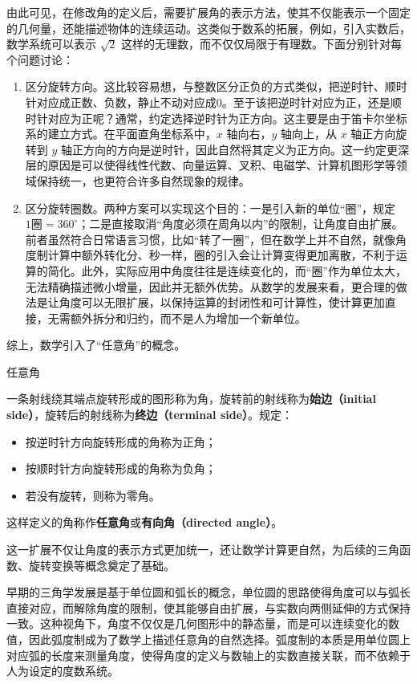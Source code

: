 由此可见，在修改角的定义后，需要扩展角的表示方法，使其不仅能表示一个固定的几何量，还能描述物体的连续运动。这类似于数系的拓展，例如，引入实数后，数学系统可以表示 $\sqrt{2}$ 这样的无理数，而不仅仅局限于有理数。下面分别针对每个问题讨论：
\begin{enumerate}
\item 区分旋转方向。这比较容易想，与整数区分正负的方式类似，把逆时针、顺时针对应成正数、负数，静止不动对应成$0$。至于该把逆时针对应为正，还是顺时针对应为正呢？通常，约定选择逆时针为正方向。这主要是由于笛卡尔坐标系的建立方式。在平面直角坐标系中，$x$ 轴向右，$y$ 轴向上，从 $x$ 轴正方向旋转到 $y$ 轴正方向的方向是逆时针，因此自然将其定义为正方向。这一约定更深层的原因是可以使得线性代数、向量运算、叉积、电磁学、计算机图形学等领域保持统一，也更符合许多自然现象的规律。
\item 区分旋转圈数。两种方案可以实现这个目的：一是引入新的单位“圈”，规定$1\text{圈}=360^\circ$；二是直接取消“角度必须在周角以内”的限制，让角度自由扩展。前者虽然符合日常语言习惯，比如“转了一圈”，但在数学上并不自然，就像角度制计算中额外转化分、秒一样，圈的引入会让计算变得更加离散，不利于运算的简化。此外，实际应用中角度往往是连续变化的，而“圈”作为单位太大，无法精确描述微小增量，因此并无额外优势。从数学的发展来看，更合理的做法是让角度可以无限扩展，以保持运算的封闭性和可计算性，使计算更加直接，无需额外拆分和归约，而不是人为增加一个新单位。
\end{enumerate}

综上，数学引入了“任意角”的概念。

\begin{definition}{任意角}\label{def_HsAngl_1}

一条射线绕其端点旋转形成的图形称为角，旋转前的射线称为\textbf{始边（initial side）}，旋转后的射线称为\textbf{终边（terminal side）}。规定：
\begin{itemize}
\item 按逆时针方向旋转形成的角称为正角；
\item 按顺时针方向旋转形成的角称为负角；
\item 若没有旋转，则称为零角。
\end{itemize}
这样定义的角称作\textbf{任意角}或\textbf{有向角（directed angle）}。
\end{definition}

这一扩展不仅让角度的表示方式更加统一，还让数学计算更自然，为后续的三角函数、旋转变换等概念奠定了基础。

早期的三角学发展是基于单位圆和弧长的概念，单位圆的思路使得角度可以与弧长直接对应，而解除角度的限制，使其能够自由扩展，与实数向两侧延伸的方式保持一致。这种视角下，角度不仅仅是几何图形中的静态量，而是可以连续变化的数值，因此弧度制成为了数学上描述任意角的自然选择。弧度制的本质是用单位圆上对应弧的长度来测量角度，使得角度的定义与数轴上的实数直接关联，而不依赖于人为设定的度数系统。

